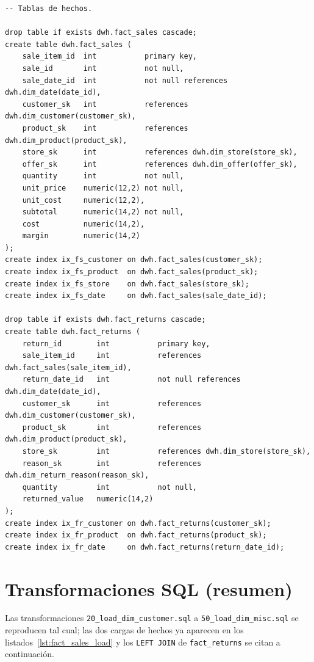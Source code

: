 \begin{lstlisting}[language=SQLpostgres,
  caption={\texttt{sql/02\_dwh\_schema/20\_fact\_tables.sql}: hechos del
  DWH.},
  label={lst:ap-fact-tables}]
-- Tablas de hechos.

drop table if exists dwh.fact_sales cascade;
create table dwh.fact_sales (
    sale_item_id  int           primary key,
    sale_id       int           not null,
    sale_date_id  int           not null references dwh.dim_date(date_id),
    customer_sk   int           references dwh.dim_customer(customer_sk),
    product_sk    int           references dwh.dim_product(product_sk),
    store_sk      int           references dwh.dim_store(store_sk),
    offer_sk      int           references dwh.dim_offer(offer_sk),
    quantity      int           not null,
    unit_price    numeric(12,2) not null,
    unit_cost     numeric(12,2),
    subtotal      numeric(14,2) not null,
    cost          numeric(14,2),
    margin        numeric(14,2)
);
create index ix_fs_customer on dwh.fact_sales(customer_sk);
create index ix_fs_product  on dwh.fact_sales(product_sk);
create index ix_fs_store    on dwh.fact_sales(store_sk);
create index ix_fs_date     on dwh.fact_sales(sale_date_id);

drop table if exists dwh.fact_returns cascade;
create table dwh.fact_returns (
    return_id        int           primary key,
    sale_item_id     int           references dwh.fact_sales(sale_item_id),
    return_date_id   int           not null references dwh.dim_date(date_id),
    customer_sk      int           references dwh.dim_customer(customer_sk),
    product_sk       int           references dwh.dim_product(product_sk),
    store_sk         int           references dwh.dim_store(store_sk),
    reason_sk        int           references dwh.dim_return_reason(reason_sk),
    quantity         int           not null,
    returned_value   numeric(14,2)
);
create index ix_fr_customer on dwh.fact_returns(customer_sk);
create index ix_fr_product  on dwh.fact_returns(product_sk);
create index ix_fr_date     on dwh.fact_returns(return_date_id);
\end{lstlisting}

\section{Transformaciones SQL (resumen)}
\label{ap:transformaciones}

Las transformaciones \texttt{20\_load\_dim\_customer.sql} a
\texttt{50\_load\_dim\_misc.sql} se reproducen tal cual; las dos cargas
de hechos ya aparecen en los listados~\ref{lst:fact_sales_load} y los
\texttt{LEFT JOIN} de \texttt{fact\_returns} se citan a continuación.

